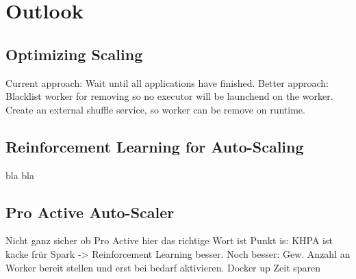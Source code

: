 \chapter{Outlook}
\label{chap:08_outlook}
%

\section{Optimizing Scaling}
Current approach: Wait until all applications have finished.
Better approach: Blacklist worker for removing so no executor will be launchend on the worker.
Create an external shuffle service, so worker can be remove on runtime.


\section{Reinforcement Learning for Auto-Scaling}
bla bla

\section{Pro Active Auto-Scaler}
Nicht ganz sicher ob Pro Active hier das richtige Wort ist
Punkt is: KHPA ist kacke frür Spark -> Reinforcement Learning besser.
Noch besser: Gew. Anzahl an Worker bereit stellen und erst bei bedarf aktivieren. Docker up Zeit sparen

